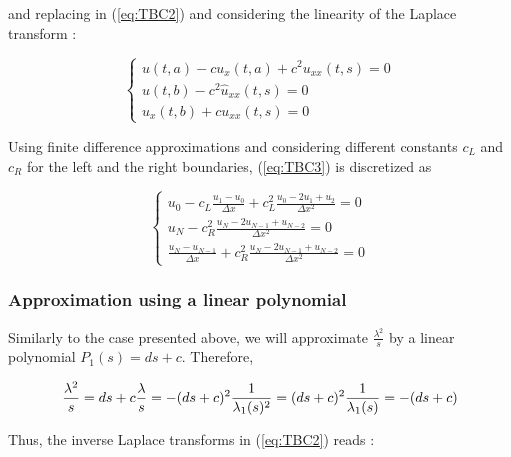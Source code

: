 \noindent and replacing in (\ref{eq:TBC2}) and considering the linearity of the Laplace transform : 

\begin{equation}
\label{eq:TBC3}
    \begin{cases}
        u(t,a) - c u_x(t,a)  + c^2  u_{xx}(t,s) = 0 \\
        u(t,b) - c^2    \hat{u}_{xx}(t,s) = 0 \\
        u_x(t,b) + c u_{xx}(t,s)= 0 
    \end{cases}
\end{equation}

\indent Using finite difference approximations and considering different constants $c_L$ and $c_R$ for the left and the right boundaries, (\ref{eq:TBC3}) is discretized as

\begin{equation}
\label{eq:TBC4}
    \begin{cases}
        u_0 - c_L \frac{u_1 - u_0}{\Delta x}  + c_L^2  \frac{u_0 -2u_1 + u_2}{\Delta x^2} = 0 \\
        u_N - c_R^2    \frac{u_N -2u_{N-1} + u_{N-2}}{\Delta x^2} = 0 \\
        \frac{u_N - u_{N-1}}{\Delta x}  + c_R^2    \frac{u_N -2u_{N-1} + u_{N-2}}{\Delta x^2} = 0 
    \end{cases}
\end{equation}



\subsubsection{Approximation using a linear polynomial}


\indent Similarly to the case presented above, we will approximate $\frac{\lambda^2}{s}$ by a linear polynomial $P_1(s) = ds + c$. Therefore,

\begin{equation}
    \frac{\lambda^2}{s} = ds + c \\
    \frac{\lambda}{s} = -(ds + c )^2 \\
    \frac{1}{\lambda_1(s)^2} = (ds + c )^2 \\
    \frac{1}{\lambda_1(s)} = -(ds + c )  
\end{equation}

\indent Thus, the inverse Laplace transforms in (\ref{eq:TBC2}) reads :

